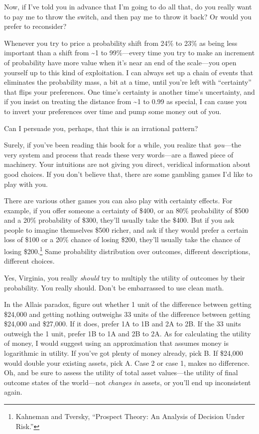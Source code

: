  Now, if I've told you in advance that
I'm going to do all that, do you really want to pay me
to throw the switch, and then pay me to throw it back? Or would you
prefer to reconsider?


 Whenever you try to price a probability shift from 24\% to 23\% as
being less important than a shift from \~{}1 to 99\%---every time you
try to make an increment of probability have more value when
it's near an end of the scale---you open yourself up to
this kind of exploitation. I can always set up a chain of events that
eliminates the probability mass, a bit at a time, until
you're left with
``certainty'' that flips your
preferences. One time's certainty is another
time's uncertainty, and if you insist on treating the
distance from \~{}1 to 0.99 as special, I can cause you to invert your
preferences over time and pump some money out of you.


 Can I persuade you, perhaps, that this is an irrational pattern?


 Surely, if you've been reading this book for a
while, you realize that \textit{you}{}---the very system and process
that reads these very words---are a flawed piece of machinery. Your
intuitions are not giving you direct, veridical information about good
choices. If you don't believe that, there are some
gambling games I'd like to play with you.


 There are various other games you can also play with certainty
effects. For example, if you offer someone a certainty of \$400, or an
80\% probability of \$500 and a 20\% probability of \$300,
they'll usually take the \$400. But if you ask people
to imagine themselves \$500 richer, and ask if they would prefer a
certain loss of \$100 or a 20\% chance of losing \$200,
they'll usually take the chance of losing
\$200.\footnote{Kahneman and Tversky, ``Prospect Theory: An
Analysis of Decision Under Risk.''} Same probability distribution over outcomes,
different descriptions, different choices.


 Yes, Virginia, you really \textit{should} try to multiply the
utility of outcomes by their probability. You really should.
Don't be embarrassed to use clean math.


 In the Allais paradox, figure out whether 1 unit of the difference
between getting \$24,000 and getting nothing outweighs 33 units of the
difference between getting \$24,000 and \$27,000. If it does, prefer 1A
to 1B and 2A to 2B. If the 33 units outweigh the 1 unit, prefer 1B to
1A and 2B to 2A. As for calculating the utility of money, I would
suggest using an approximation that assumes money is logarithmic in
utility. If you've got plenty of money already, pick B.
If \$24,000 would double your existing assets, pick A. Case 2 or case
1, makes no difference. Oh, and be sure to assess the utility of total
asset values---the utility of final outcome states of the world---not
\textit{changes in} assets, or you'll end up
inconsistent again.


